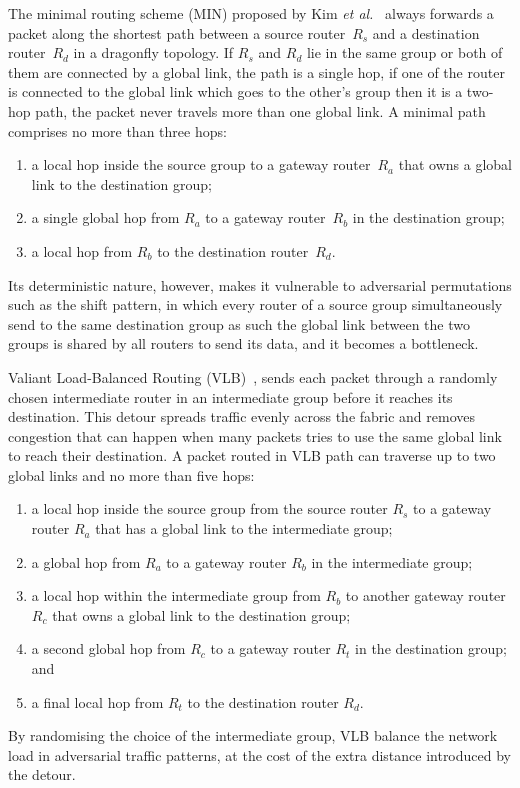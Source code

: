 The minimal routing scheme (MIN) proposed by Kim \emph{et al.}~\cite{kim2008technology}
always forwards a packet along the shortest path between a source router~$R_s$ and a destination
router~$R_d$ in a dragonfly topology. If $R_s$ and $R_d$ lie in the same group or both of them are connected by a global link, the path is a single hop, if one of the router is connected to the global link which goes to the other's group then it is a two-hop path, the packet never travels more than one global link. 
A minimal path comprises no more than three hops:

\begin{enumerate}
  \item a local hop inside the source group to a gateway router~$R_a$ that owns a global
        link to the destination group;
  \item a single global hop from $R_a$ to a gateway router~$R_b$ in the destination group;
  \item a local hop from $R_b$ to the destination router~$R_d$.
\end{enumerate}

Its deterministic nature, however, makes it vulnerable to adversarial permutations such
as the shift pattern, in which every router of a source group simultaneously send to the same
destination group as such the global link between the two groups is shared by all routers
to send its data, and it becomes a bottleneck.


Valiant Load-Balanced Routing (VLB)~\cite{kim2008technology, kaplan2017unveiling}, sends each packet through a randomly chosen intermediate router in an intermediate group before it reaches its destination. This detour spreads traffic evenly across the
fabric and removes congestion that can happen when many packets tries to use the same global link to reach their destination. A packet routed in VLB path can traverse up to two global links and no more than five hops:
\begin{enumerate}
  \item a local hop inside the source group from the source router \(R_s\) to a
        gateway router \(R_a\) that has a global link to the intermediate group;
  \item a global hop from \(R_a\) to a gateway router \(R_b\) in the
        intermediate group;
  \item a local hop within the intermediate group from \(R_b\) to another
        gateway router \(R_c\) that owns a global link to the destination group;
  \item a second global hop from \(R_c\) to a gateway router \(R_t\) in the
        destination group; and
  \item a final local hop from \(R_t\) to the destination router \(R_d\).
\end{enumerate}
By randomising the choice of the intermediate group, VLB balance the network load in adversarial
traffic patterns, at the cost of the extra distance introduced by the detour. 

